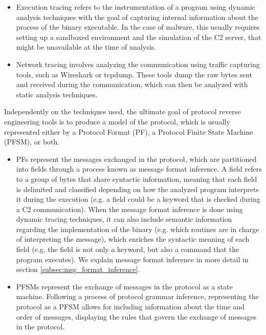 \documentclass[conference]{IEEEtran}
\begin{document}
\begin{itemize}
    \item Execution tracing refers to the instrumentation of a program using dynamic
          analysis techniques with the goal of capturing internal information about the
          process of the binary executable. In the case of malware, this usually requires
          setting up a sandboxed environment and the simulation of the C2 server, that
          might be unavailable at the time of analysis.
    \item Network tracing involves analyzing the communication using traffic capturing
          tools, such as Wireshark or tcpdump. These tools dump the raw bytes sent and
          received during the communication, which can then be analyzed with static
          analysis techniques.
\end{itemize}

Independently on the techniques used, the ultimate goal of protocol reverse
engineering tools is to produce a model of the protocol, which is usually
represented either by a Protocol Format (PF), a Protocol Finite State Machine
(PFSM), or both.
\begin{itemize}
    \item PFs represent the messages exchanged in the protocol, which are partitioned into fields
          through a process known as message format inference. A field refers to a group of
          bytes that share syntactic information, meaning that each field is delimited
          and classified depending on how the analyzed program interprets it during the
          execution \cite{polyglot_caballero} (e.g. a field could be a keyword that is
          checked during a C2 communication). When the message format inference is done
          using dynamic tracing techniques, it can also include semantic information regarding
          the implementation of the binary (e.g. which routines are in charge of
          interpreting the message), which enriches the syntactic meaning of each field
          (e.g. the field is not only a keyword, but also a command that the program
          executes). We explain message format inference in more detail in section \ref{subsec:msg_format_inference}.
    \item PFSMs represent the exchange of messages in the protocol as a state machine.
          Following a process of protocol grammar inference, representing the protocol as
          a PFSM allows for including information about the time and order of messages,
          displaying the rules that govern the exchange of messages in the protocol.
\end{itemize}
\end{document}
